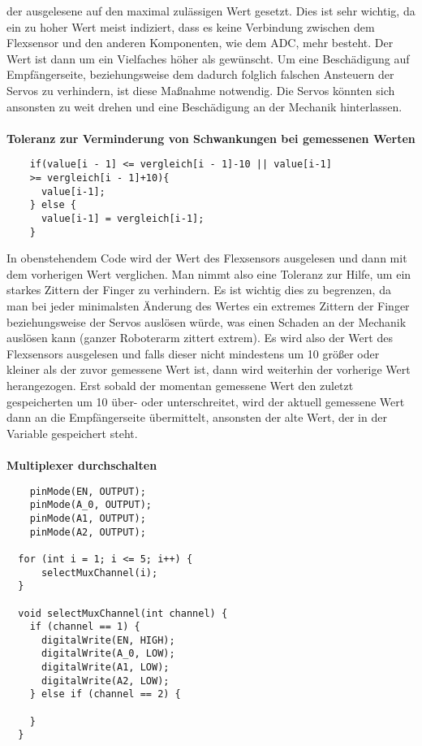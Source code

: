 \documentclass[titlepage,12pt,twoside]{article}
\begin{document}
der ausgelesene auf den maximal zulässigen Wert gesetzt. Dies ist sehr wichtig, da 
ein zu hoher Wert meist indiziert, dass es keine Verbindung zwischen dem Flexsensor 
und den anderen Komponenten, wie dem ADC, mehr besteht. Der Wert ist dann um ein 
Vielfaches höher als gewünscht. Um eine Beschädigung auf Empfängerseite, beziehungsweise 
dem dadurch folglich falschen Ansteuern der Servos zu verhindern, ist diese Maßnahme 
notwendig. Die Servos könnten sich ansonsten zu weit drehen und eine Beschädigung an 
der Mechanik hinterlassen. \\
\\
\textbf{Toleranz zur Verminderung von Schwankungen bei gemessenen Werten} \\
\footnotesize
\begin{lstlisting}
    if(value[i - 1] <= vergleich[i - 1]-10 || value[i-1]
	>= vergleich[i - 1]+10){
      value[i-1];
    } else {
      value[i-1] = vergleich[i-1];
    }
\end{lstlisting}
\hfill \break
\normalsize
In obenstehendem Code wird der Wert des Flexsensors ausgelesen und dann mit dem 
vorherigen Wert verglichen. Man nimmt also eine Toleranz zur Hilfe, um ein starkes 
Zittern der Finger zu verhindern. Es ist wichtig dies zu begrenzen, da man bei jeder 
minimalsten Änderung des Wertes ein extremes Zittern der Finger beziehungsweise der 
Servos auslösen würde, was einen Schaden an der Mechanik auslösen kann (ganzer 
Roboterarm zittert extrem). Es wird also der Wert des Flexsensors ausgelesen und falls 
dieser nicht mindestens um 10 größer oder kleiner als der zuvor gemessene Wert ist, dann 
wird weiterhin der vorherige Wert herangezogen. Erst sobald der momentan gemessene Wert 
den zuletzt gespeicherten um 10 über- oder unterschreitet, wird der aktuell gemessene 
Wert dann an die Empfängerseite übermittelt, ansonsten der alte Wert, der in der 
Variable  gespeichert steht. \\
\\
\textbf{Multiplexer durchschalten} \\
\footnotesize
\begin{lstlisting}
	pinMode(EN, OUTPUT);
	pinMode(A_0, OUTPUT);
	pinMode(A1, OUTPUT);
	pinMode(A2, OUTPUT);
  
  for (int i = 1; i <= 5; i++) {
	  selectMuxChannel(i);
  }
  
  void selectMuxChannel(int channel) {
	if (channel == 1) {
	  digitalWrite(EN, HIGH);
	  digitalWrite(A_0, LOW);
	  digitalWrite(A1, LOW);
	  digitalWrite(A2, LOW);
	} else if (channel == 2) {
	  
	}
  }
\end{lstlisting}
\end{document}
